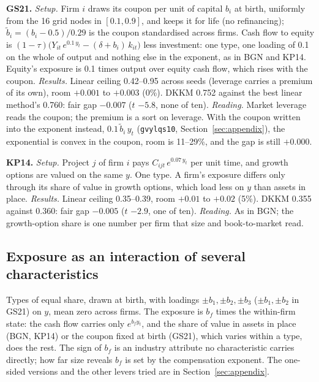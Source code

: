 \documentclass[11pt]{article}
\begin{document}
\noindent\textbf{GS21.} \emph{Setup.} Firm $i$ draws its coupon per unit of capital $b_i$ at birth, uniformly from the 16 grid nodes in $[0.1, 0.9]$, and keeps it for life (no refinancing); $\tilde b_i = (b_i - 0.5)/0.29$ is the coupon standardised across firms. Cash flow to equity is $(1-\tau)\big(Y_{it}\,e^{0.1\,y_t} - (\delta + b_i)\,k_{it}\big)$ less investment: one type, one loading of 0.1 on the whole of output and nothing else in the exponent, as in BGN and KP14. Equity's exposure is 0.1 times output over equity cash flow, which rises with the coupon. \emph{Results.} Linear ceiling 0.42--0.95 across seeds (leverage carries a premium of its own), room $+0.001$ to $+0.003$ (0\%). DKKM 0.752 against the best linear method's 0.760: fair gap $-0.007$ ($t$ $-5.8$, none of ten). \emph{Reading.} Market leverage reads the coupon; the premium is a sort on leverage. With the coupon written into the exponent instead, $0.1\,\tilde b_i\,y_t$ (\texttt{gvylqs10}, Section~\ref{sec:appendix}), the exponential is convex in the coupon, room is 11--29\%, and the gap is still $+0.000$.

\noindent\textbf{KP14.} \emph{Setup.} Project $j$ of firm $i$ pays $C_{ijt}\,e^{0.07\,y_t}$ per unit time, and growth options are valued on the same $y$. One type. A firm's exposure differs only through its share of value in growth options, which load less on $y$ than assets in place. \emph{Results.} Linear ceiling 0.35--0.39, room $+0.01$ to $+0.02$ (5\%). DKKM 0.355 against 0.360: fair gap $-0.005$ ($t$ $-2.9$, one of ten). \emph{Reading.} As in BGN; the growth-option share is one number per firm that size and book-to-market read.

\subsection{Exposure as an interaction of several characteristics}

Types of equal share, drawn at birth, with loadings $\pm b_1, \pm b_2, \pm b_3$ ($\pm b_1, \pm b_2$ in GS21) on $y$, mean zero across firms. The exposure is $b_f$ times the within-firm state: the cash flow carries only $e^{b_f y_t}$, and the share of value in assets in place (BGN, KP14) or the coupon fixed at birth (GS21), which varies within a type, does the rest. The sign of $b_f$ is an industry attribute no characteristic carries directly; how far size reveals $b_f$ is set by the compensation exponent. The one-sided versions and the other levers tried are in Section~\ref{sec:appendix}.

\end{document}
